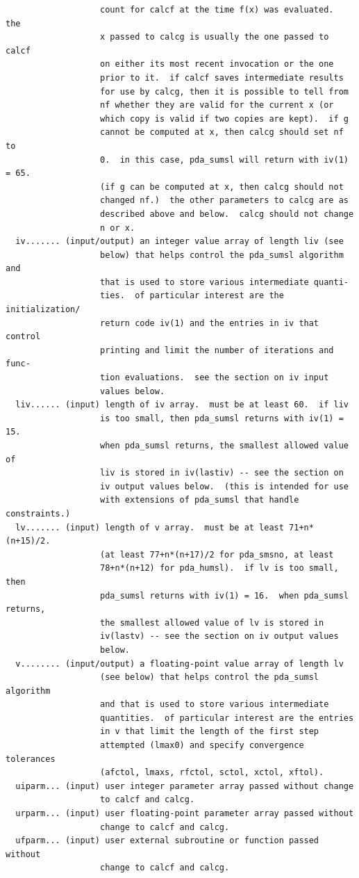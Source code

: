\documentclass[11pt,twoside]{article}
\begin{document}
\begin{verbatim}
                   count for calcf at the time f(x) was evaluated.  the
                   x passed to calcg is usually the one passed to calcf
                   on either its most recent invocation or the one
                   prior to it.  if calcf saves intermediate results
                   for use by calcg, then it is possible to tell from
                   nf whether they are valid for the current x (or
                   which copy is valid if two copies are kept).  if g
                   cannot be computed at x, then calcg should set nf to
                   0.  in this case, pda_sumsl will return with iv(1) = 65.
                   (if g can be computed at x, then calcg should not
                   changed nf.)  the other parameters to calcg are as
                   described above and below.  calcg should not change
                   n or x.
  iv....... (input/output) an integer value array of length liv (see
                   below) that helps control the pda_sumsl algorithm and
                   that is used to store various intermediate quanti-
                   ties.  of particular interest are the initialization/
                   return code iv(1) and the entries in iv that control
                   printing and limit the number of iterations and func-
                   tion evaluations.  see the section on iv input
                   values below.
  liv...... (input) length of iv array.  must be at least 60.  if liv
                   is too small, then pda_sumsl returns with iv(1) = 15.
                   when pda_sumsl returns, the smallest allowed value of
                   liv is stored in iv(lastiv) -- see the section on
                   iv output values below.  (this is intended for use
                   with extensions of pda_sumsl that handle constraints.)
  lv....... (input) length of v array.  must be at least 71+n*(n+15)/2.
                   (at least 77+n*(n+17)/2 for pda_smsno, at least
                   78+n*(n+12) for pda_humsl).  if lv is too small, then
                   pda_sumsl returns with iv(1) = 16.  when pda_sumsl returns,
                   the smallest allowed value of lv is stored in
                   iv(lastv) -- see the section on iv output values
                   below.
  v........ (input/output) a floating-point value array of length lv
                   (see below) that helps control the pda_sumsl algorithm
                   and that is used to store various intermediate
                   quantities.  of particular interest are the entries
                   in v that limit the length of the first step
                   attempted (lmax0) and specify convergence tolerances
                   (afctol, lmaxs, rfctol, sctol, xctol, xftol).
  uiparm... (input) user integer parameter array passed without change
                   to calcf and calcg.
  urparm... (input) user floating-point parameter array passed without
                   change to calcf and calcg.
  ufparm... (input) user external subroutine or function passed without
                   change to calcf and calcg.


\end{verbatim}
\end{document}
